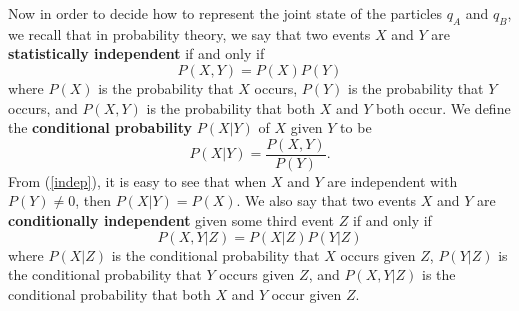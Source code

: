 Now in order to decide how to represent the joint state of the particles $q_A$ and $q_B$, we recall that  in probability theory, we say that two events $X$ and $Y$ are \textbf{statistically independent} if and only if 
\begin{equation}\label{indep}
    P(X, Y)=P(X)P(Y)
\end{equation}
where $P(X)$ %
%
is the probability that $X$ occurs, $P(Y)$ is the probability that $Y$ occurs, and $P(X, Y)$ is the probability that both $X$ and $Y$ both occur. We define the \textbf{conditional probability} $P(X|Y)$ %
%
of $X$ given $Y$ to be
\begin{equation}\label{conditionaprob}
P(X|Y)= \frac{P(X, Y)}{P(Y)}.
\end{equation}
From (\ref{indep}), it is easy to see that when $X$ and $Y$ are independent with $P(Y)\neq 0$, then $P(X|Y)=P(X)$. We also say that two events $X$ and $Y$ are \textbf{conditionally independent} given some third event $Z$ if and only if 
\begin{equation}\label{indepcond}
P(X, Y|Z)=P(X|Z)P(Y|Z)
\end{equation} where $P(X|Z)$ is the conditional probability that $X$ occurs given $Z$, $P(Y|Z)$ is the conditional probability that $Y$ occurs given $Z$, and $P(X, Y|Z)$ is the conditional probability that both $X$ and $Y$  occur given $Z$.   

